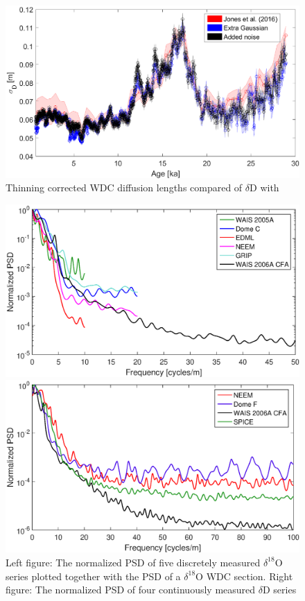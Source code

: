 \documentclass[draft, jgrga]{AGUTeX}
\begin{document}
\begin{figure}
	\includegraphics[width=.9\linewidth]{WAIS_diffusion_lengths_thinning_corr.eps}
	\caption{Thinning corrected WDC diffusion lengths compared of $\delta$D with \cite{Jones2016}} \label{WAIS_diffusion_lengths_thinning_corr}
\end{figure}


\begin{figure}[]
	\centering
	\begin{minipage}{.5\textwidth}
		\centering
		\includegraphics[width=0.9\linewidth]{PSD_discrete_plus_cfa_v1.eps}

	\end{minipage}%
	\begin{minipage}{0.5\textwidth}
		\centering
		\indent\includegraphics[width=0.9\linewidth]{PSD_CFA_v1.eps}
		
	\end{minipage}
	\caption{Left figure: The normalized PSD of five discretely measured $\delta^{18}\mathrm{O}$ series
	plotted together with the PSD of a $\delta^{18}\mathrm{O}$ WDC section. Right figure: 
	The normalized PSD of four continuously measured $\delta$D series}
\label{spectra_disVScfa}
\end{figure}
\end{document}
